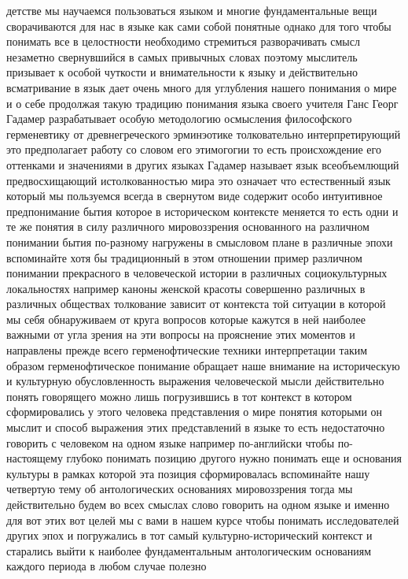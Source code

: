 детстве мы научаемся пользоваться языком и многие фундаментальные вещи
сворачиваются для нас в языке как сами собой понятные однако для того чтобы
понимать все в целостности необходимо стремиться разворачивать смысл незаметно
свернувшийся в самых привычных словах поэтому мыслитель призывает к особой
чуткости и внимательности к языку и действительно всматривание в язык дает очень
много для углубления нашего понимания о мире и о себе продолжая такую традицию
понимания языка своего учителя Ганс Георг Гадамер разрабатывает особую
методологию осмысления философского герменевтику от древнегреческого эрминэотике
толковательно интерпретирующий это предполагает работу со словом его этимогогии
то есть происхождение его оттенками и значениями в других языках Гадамер
называет язык всеобъемлющий предвосхищающий истолкованностью мира это означает
что естественный язык который мы пользуемся всегда в свернутом виде содержит
особо интуитивное предпонимание бытия которое в историческом контексте меняется
то есть одни и те же понятия в силу различного мировоззрения основанного на
различном понимании бытия по-разному нагружены в смысловом плане в различные
эпохи вспоминайте хотя бы традиционный в этом отношении пример различном
понимании прекрасного в человеческой истории в различных социокультурных
локальностях например каноны женской красоты совершенно различных в различных
обществах толкование зависит от контекста той ситуации в которой мы себя
обнаруживаем от круга вопросов которые кажутся в ней наиболее важными от угла
зрения на эти вопросы на прояснение этих моментов и направлены прежде всего
герменофтические техники интерпретации таким образом герменофтическое понимание
обращает наше внимание на историческую и культурную обусловленность выражения
человеческой мысли действительно понять говорящего можно лишь погрузившись в тот
контекст в котором сформировались у этого человека представления о мире понятия
которыми он мыслит и способ выражения этих представлений в языке то есть
недостаточно говорить с человеком на одном языке например по-английски чтобы по-
настоящему глубоко понимать позицию другого нужно понимать еще и основания
культуры в рамках которой эта позиция сформировалась вспоминайте нашу четвертую
тему об антологических основаниях мировоззрения тогда мы действительно будем во
всех смыслах слово говорить на одном языке и именно для вот этих вот целей мы с
вами в нашем курсе чтобы понимать исследователей других эпох и погружались в тот
самый культурно-исторический контекст и старались выйти к наиболее
фундаментальным антологическим основаниям каждого периода в любом случае полезно

